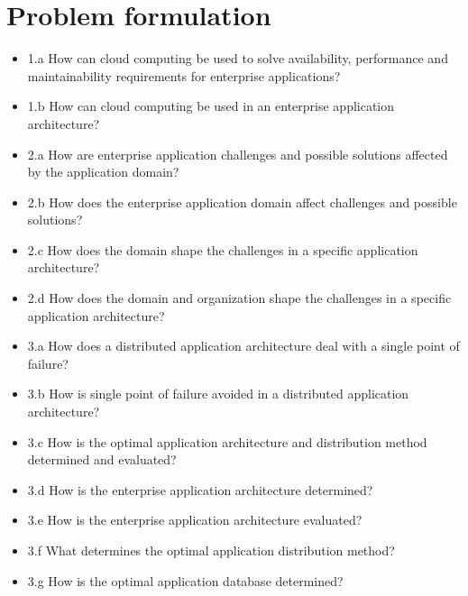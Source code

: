 \section{Problem formulation}
\label{sc:problem_formulation}

\begin{itemize}  
\item 1.a How can cloud computing be used to solve availability, performance and maintainability requirements for enterprise applications?


\item 1.b How can cloud computing be used in an enterprise application architecture?

\item 2.a How are enterprise application challenges and possible solutions affected by the application domain?
\item 2.b How does the enterprise application domain affect challenges and possible solutions?
\item 2.c How does the domain shape the challenges in a specific application architecture?
\item 2.d How does the domain and organization shape the challenges in a specific application architecture?

\item 3.a How does a distributed application architecture deal with a single point of failure?
\item 3.b How is single point of failure avoided in a distributed application architecture?
\item 3.c How is the optimal application architecture and distribution method determined and evaluated?
\item 3.d How is the enterprise application architecture determined?
\item 3.e How is the enterprise application architecture evaluated?
\item 3.f What determines the optimal application distribution method?
\item 3.g How is the optimal application database determined?
\end{itemize}